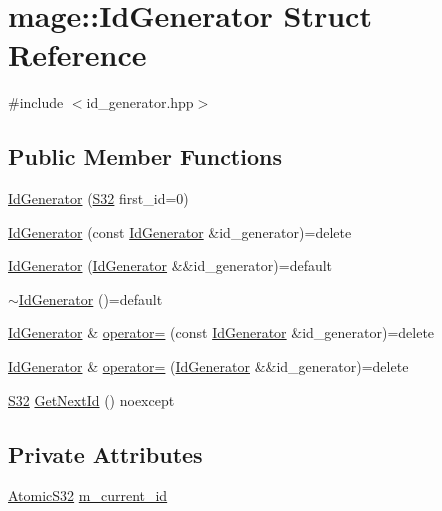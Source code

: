 \hypertarget{structmage_1_1_id_generator}{}\section{mage\+:\+:Id\+Generator Struct Reference}
\label{structmage_1_1_id_generator}


{\ttfamily \#include $<$id\+\_\+generator.\+hpp$>$}

\subsection*{Public Member Functions}
\begin{DoxyCompactItemize}
\item 
\hyperlink{structmage_1_1_id_generator_a59392d3cbba77c323c467fffb539f630}{Id\+Generator} (\hyperlink{namespacemage_a642e05c5c83642b6946703615cdbf2da}{S32} first\+\_\+id=0)
\item 
\hyperlink{structmage_1_1_id_generator_a6f502d2cd8b63e7c76f31834b028a11d}{Id\+Generator} (const \hyperlink{structmage_1_1_id_generator}{Id\+Generator} \&id\+\_\+generator)=delete
\item 
\hyperlink{structmage_1_1_id_generator_a0ee69053c6cdb9f79a5857e65ebd2b6a}{Id\+Generator} (\hyperlink{structmage_1_1_id_generator}{Id\+Generator} \&\&id\+\_\+generator)=default
\item 
\hyperlink{structmage_1_1_id_generator_a70161ab5b10294ebba1ace7a3b0f8d31}{$\sim$\+Id\+Generator} ()=default
\item 
\hyperlink{structmage_1_1_id_generator}{Id\+Generator} \& \hyperlink{structmage_1_1_id_generator_a370c8289f38a534006e8b9ca7ec78026}{operator=} (const \hyperlink{structmage_1_1_id_generator}{Id\+Generator} \&id\+\_\+generator)=delete
\item 
\hyperlink{structmage_1_1_id_generator}{Id\+Generator} \& \hyperlink{structmage_1_1_id_generator_aace8082947445d26d2421ba8b361f1bc}{operator=} (\hyperlink{structmage_1_1_id_generator}{Id\+Generator} \&\&id\+\_\+generator)=delete
\item 
\hyperlink{namespacemage_a642e05c5c83642b6946703615cdbf2da}{S32} \hyperlink{structmage_1_1_id_generator_a9e0e86e5feab919f5ac5ab4ad8f51b09}{Get\+Next\+Id} () noexcept
\end{DoxyCompactItemize}
\subsection*{Private Attributes}
\begin{DoxyCompactItemize}
\item 
\hyperlink{namespacemage_a34972c09c02b691cd7cc5ea34db1e778}{Atomic\+S32} \hyperlink{structmage_1_1_id_generator_af834ccd6b694775f434949a1c1382965}{m\+\_\+current\+\_\+id}
\end{DoxyCompactItemize}


